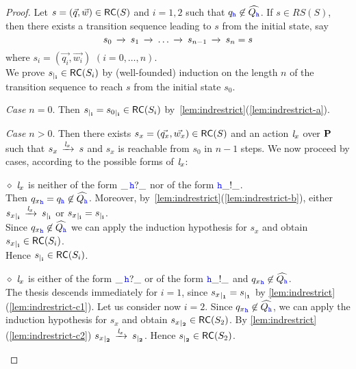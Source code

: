 \begin{proof}
Let $s = (\vec{q},\vec{w}) \in \mathsf{RC}(S)$ and $i=1,2$ such that ${q}_{{\mathtt{\color{blue}{ {h}}}}}\not\in\widehat{Q_{{\mathtt{\color{blue}{ {h}}}}}}$.
If $s \in RS(S)$, then there exists a transition sequence leading to $s$ from the initial state, say
$$s_0\,\xrightarrow{}_{{}}\,s_1\,\xrightarrow{}_{{}}\, \ldots\,\xrightarrow{}_{{}}\, s_{n-1}\,\xrightarrow{}_{{}}\,s_n=s$$
where $s_i = (\vec{q_i},\vec{w_i})$ $(i=0,\ldots,n)$.\\
We prove ${s}_{\mid_{\mathbf{i}}}\in \mathsf{RC}(S_i)$  by (well-founded) induction on the length $n$ of the transition sequence to reach $s$ from the initial state $s_0$.

{\em Case $n=0$}. Then ${s}_{\mid_{\mathbf{i}}} = {s_0}_{\mid_{\mathbf{i}}} \in \mathsf{RC}(S_i)$
by~\cref{lem:indrestrict}(\ref{lem:indrestrict-a}).


{\em Case $n>0$}.
Then there exists $s_x = (\vec{q_x},\vec{w_x}) \in \mathsf{RC}(S)$ and an action $\mathit{l}_x$ over $\mathbf{P}$
such that $s_x\,\xrightarrow{\mathit{l}_x}_{{}}\,s$ and $s_x$ is reachable from $s_0$ in $n-1$ steps.
We now proceed by cases, according to the possible forms of $\mathit{l}_x$:

\begin{description}
%
\item
\underline{$\diamond$}
$\mathit{l}_x$ is neither of the form $\_\,{\mathtt{\color{blue}{ {h}}}}?\_$ nor of the form ${\mathtt{\color{blue}{ {h}}}}\_!\_$.\\
Then ${q_x}_{{\mathtt{\color{blue}{ {h}}}}}={q}_{{\mathtt{\color{blue}{ {h}}}}}\not\in\widehat{Q_{{\mathtt{\color{blue}{ {h}}}}}}$.
Moreover, by~\cref{lem:indrestrict}(\ref{lem:indrestrict-b}),
either ${s_x}_{\mid_{\mathbf{i}}}\,\xrightarrow{\mathit{l}_x}_{{}}\,{s}_{\mid_{\mathbf{i}}}$ or  ${s_x}_{\mid_{\mathbf{i}}}={s}_{\mid_{\mathbf{i}}}$.\\
Since ${q_x}_{{\mathtt{\color{blue}{ {h}}}}}\not\in\widehat{Q_{{\mathtt{\color{blue}{ {h}}}}}}$ we can apply the induction hypothesis for $s_x$ and obtain ${s_x}_{\mid_{\mathbf{i}}}\in \mathsf{RC}(S_i)$.\\
Hence ${s}_{\mid_{\mathbf{i}}}\in \mathsf{RC}(S_i)$.
%
\item
\underline{$\diamond$}
$\mathit{l}_x$ is either of the form $\_\,{\mathtt{\color{blue}{ {h}}}}?\_$ or of the form ${\mathtt{\color{blue}{ {h}}}}\_!\_$
and ${q_x}_{\mathtt{\color{blue}{ {h}}}}\not\in\widehat{Q_{{\mathtt{\color{blue}{ {h}}}}}}$.\\
The thesis descends immediately for $i=1$, since  ${s_x}_{\mid_{\mathbf{1}}}={s}_{\mid_{\mathbf{1}}}$
by \cref{lem:indrestrict}(\ref{lem:indrestrict-c1}).
Let us consider now $i=2$. Since ${q_x}_{{\mathtt{\color{blue}{ {h}}}}}\not\in\widehat{Q_{{\mathtt{\color{blue}{ {h}}}}}}$, we can apply the induction hypothesis for $s_x$ and obtain ${s_x}_{\mid_{\mathbf{2}}}\in \mathsf{RC}(S_2)$.
By \cref{lem:indrestrict}(\ref{lem:indrestrict-c2}) ${s_x}_{\mid_{\mathbf{2}}}\,\xrightarrow{\mathit{l}_x}_{{}}\,{s}_{\mid_{\mathbf{2}}}$.
Hence ${s}_{\mid_{\mathbf{2}}}\in \mathsf{RC}(S_2)$.


\end{description}
\end{proof}

